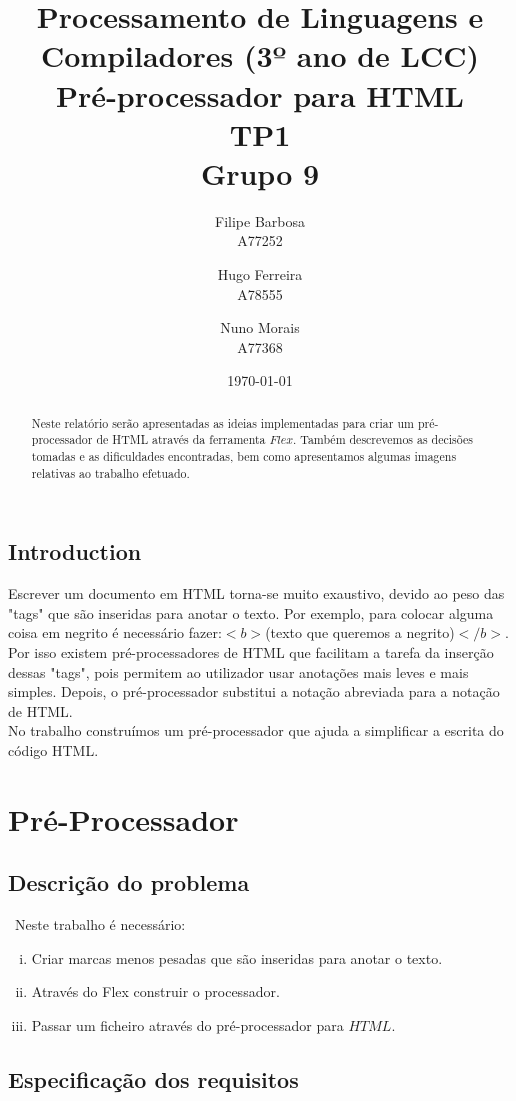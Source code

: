 \documentclass{report}
\title{Processamento de Linguagens e Compiladores (3º ano de LCC)\\ \textbf{Pré-processador para HTML}\\ TP1\\ Grupo 9}
\author{Filipe Barbosa\\ A77252 \and  Hugo Ferreira\\ A78555 \and Nuno Morais\\ A77368 }
\date{\today}
\begin{document}
\maketitle

\begin{abstract}
Neste relatório serão apresentadas as ideias implementadas para criar um pré-processador de HTML através da ferramenta $Flex$. 
Também descrevemos as decisões tomadas e as dificuldades encontradas, bem como apresentamos algumas imagens relativas ao trabalho efetuado.
\end{abstract}

\tableofcontents

\section{Introduction}
Escrever um documento em HTML torna-se muito exaustivo, devido ao peso das "tags" que são inseridas para anotar o texto. Por exemplo, para colocar alguma coisa em negrito é necessário fazer:$ <b>$(texto que queremos a negrito)$</b>$. \\ 
Por isso existem pré-processadores de HTML que facilitam a tarefa da inserção dessas "tags", pois permitem ao utilizador usar anotações mais leves e mais simples. Depois, o pré-processador substitui a notação abreviada para a notação de HTML.\\ 
No trabalho construímos um pré-processador que ajuda a simplificar a escrita do código HTML. 



\chapter{Pré-Processador} \label{fi}
\section{Descrição do problema}\
Neste trabalho é necessário:
\begin{enumerate}[i)]
\item Criar marcas menos pesadas que são inseridas para anotar o texto.
\item Através do Flex construir o processador.
\item Passar um ficheiro através do pré-processador para $HTML$.
\end{enumerate}

\section{Especificação dos requisitos}
\end{document}
